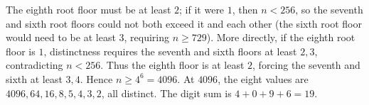The eighth root floor must be at least $2$; if it were $1$, then $n<256$, so the seventh and sixth root floors could not both exceed it and each other (the sixth root floor would need to be at least $3$, requiring $n\ge729$). More directly, if the eighth root floor is $1$, distinctness requires the seventh and sixth floors at least $2,3$, contradicting $n<256$. Thus the eighth floor is at least $2$, forcing the seventh and sixth at least $3,4$. Hence $n\ge4^6=4096$. At $4096$, the eight values are $4096,64,16,8,5,4,3,2$, all distinct. The digit sum is $4+0+9+6=\boxed{19}$.

